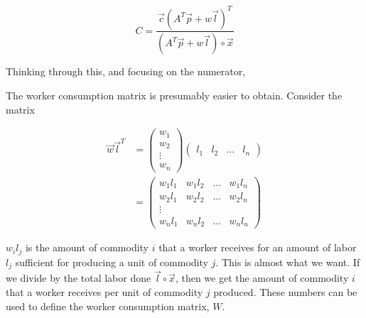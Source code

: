 \documentclass{article}
\theoremstyle{definition}
\begin{document}
\begin{equation}
    C = \frac{\vec{c}(A^T\vec{p}+w\vec{l})^T}{(A^T\vec{p}+w\vec{l})\circ \vec{x}}
\end{equation}

Thinking through this, and focusing on the numerator, 

The worker consumption matrix is presumably easier to obtain. Consider the matrix

\begin{align}
    \vec{w}\vec{l}^T &= \begin{pmatrix} w_1 \\ w_2 \\ \vdots \\ w_n \end{pmatrix} \begin{pmatrix} l_1 & l_2 & \ldots & l_n \end{pmatrix} \\
    &= \begin{pmatrix}
        w_1l_1 & w_1l_2 & \ldots & w_1l_n \\
        w_2l_1 & w_2l_2 & \ldots & w_2l_n \\
        \vdots \\
        w_nl_1 & w_nl_2 & \ldots & w_nl_n
    \end{pmatrix}
\end{align}

$w_il_j$ is the amount of commodity $i$ that a worker receives for an amount of labor $l_j$ sufficient for producing a unit of commodity $j$. This is almost what we want. If we divide by the total labor done $\vec{l}\circ \vec{x}$, then we get the amount of commodity $i$ that a worker receives per unit of commodity $j$ produced. These numbers can be used to define the worker consumption matrix, $W$. 
\end{document}
